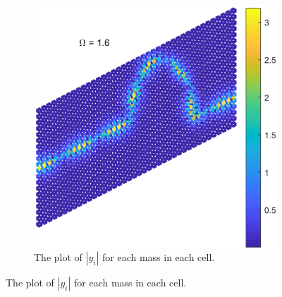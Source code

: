 \begin{figure}[!h]
\begin{subfigure}[b]{.5\textwidth}
  \includegraphics[width=1\linewidth]{imgs/curvedbendscat.png}
  \caption{The plot of $|y_i|$ for each mass in each cell.}
  \label{fig:sub2}
\end{subfigure}


\end{figure}
